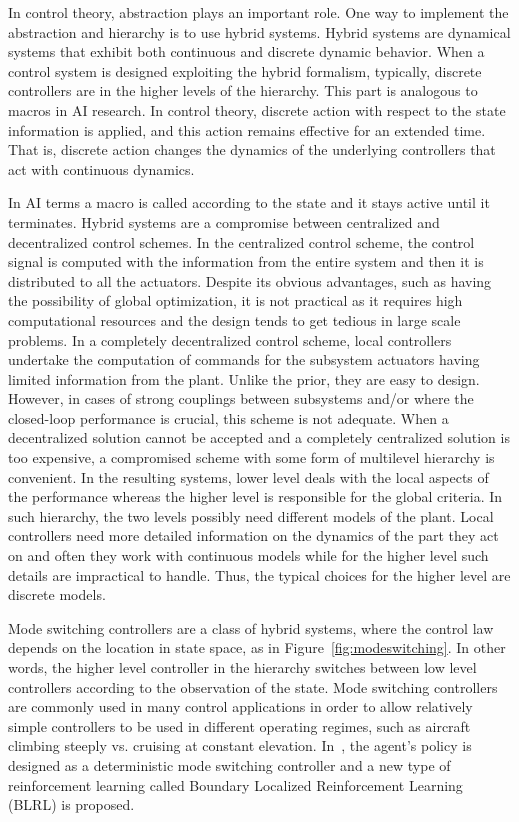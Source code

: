 In control theory, abstraction plays an important role. One way to implement the abstraction and hierarchy is to use hybrid systems. Hybrid systems are dynamical systems that exhibit both continuous and discrete dynamic behavior. When a control system is designed exploiting the hybrid formalism, typically, discrete controllers are in the higher levels of the hierarchy. This part is analogous to macros in AI research. In control theory, discrete action with respect to the state information is applied, and this action remains effective for an extended time. That is, discrete action changes the dynamics of the underlying controllers that act with continuous dynamics.

In AI terms a macro is called according to the state and it stays active until it terminates. Hybrid systems are a compromise between centralized and decentralized control schemes. In the centralized control scheme, the control signal is computed with the information from the entire system and then it is distributed to all the actuators. Despite its obvious advantages, such as having the possibility of global optimization, it is not practical as it requires high computational resources and the design tends to get tedious in large scale problems. In a completely decentralized control scheme, local controllers undertake the computation of commands for the subsystem actuators having limited information from the plant. Unlike the prior, they are easy to design. However, in cases of strong couplings between subsystems and/or where the closed-loop performance is crucial, this scheme is not adequate. When a decentralized solution cannot be accepted and a completely centralized solution is too expensive, a compromised scheme with some form of multilevel hierarchy is convenient. In the resulting systems, lower level deals with the local aspects of the performance whereas the higher level is responsible for the global criteria. In such hierarchy, the two levels possibly need different models of the plant. Local controllers need more detailed information on the dynamics of the part they act on and often they work with continuous models while for the higher level such details are impractical to handle. Thus, the typical choices for the higher level are discrete models. 

Mode switching controllers are a class of hybrid systems, where the control law depends on the location in state space, as in Figure~\ref{fig:modeswitching}. In other words, the higher level controller in the hierarchy switches between low level controllers according to the observation of the state. Mode switching controllers are commonly used in many control applications in order to allow relatively simple controllers to be used in different operating regimes, such as aircraft climbing steeply vs. cruising at constant elevation.
In~\cite{Grudic2000LocalizingSI}, the agent’s policy is designed as a deterministic mode switching controller and a new type of reinforcement learning called Boundary  Localized  Reinforcement Learning (BLRL) is proposed.


